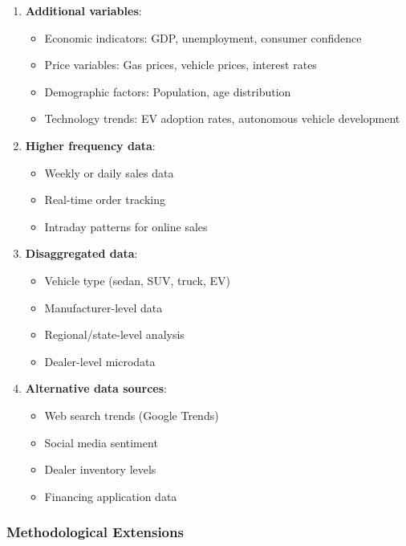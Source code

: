 \documentclass[12pt]{article}
\begin{document}
\begin{enumerate}
    \item \textbf{Additional variables}:
    \begin{itemize}
        \item Economic indicators: GDP, unemployment, consumer confidence
        \item Price variables: Gas prices, vehicle prices, interest rates
        \item Demographic factors: Population, age distribution
        \item Technology trends: EV adoption rates, autonomous vehicle development
    \end{itemize}

    \item \textbf{Higher frequency data}:
    \begin{itemize}
        \item Weekly or daily sales data
        \item Real-time order tracking
        \item Intraday patterns for online sales
    \end{itemize}

    \item \textbf{Disaggregated data}:
    \begin{itemize}
        \item Vehicle type (sedan, SUV, truck, EV)
        \item Manufacturer-level data
        \item Regional/state-level analysis
        \item Dealer-level microdata
    \end{itemize}

    \item \textbf{Alternative data sources}:
    \begin{itemize}
        \item Web search trends (Google Trends)
        \item Social media sentiment
        \item Dealer inventory levels
        \item Financing application data
    \end{itemize}
\end{enumerate}

\subsubsection*{Methodological Extensions}
\end{document}
